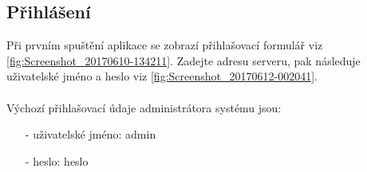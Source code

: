 \documentclass[czech,BP]{thesiskiv}
\begin{document}
\subsection{Přihlášení}	
	
Při prvním spuštění aplikace se zobrazí přihlašovací formulář viz \ref{fig:Screenshot_20170610-134211}.
Zadejte adresu serveru, pak následuje uživatelské jméno a heslo viz \ref{fig:Screenshot_20170612-002041}. 
\\\\
Výchozí přihlašovací údaje administrátora systému jsou:
\begin{itemize}[noitemsep]
\item [-] uživatelské jméno: admin
\item [-] heslo: heslo
\end{itemize}
\end{document}
